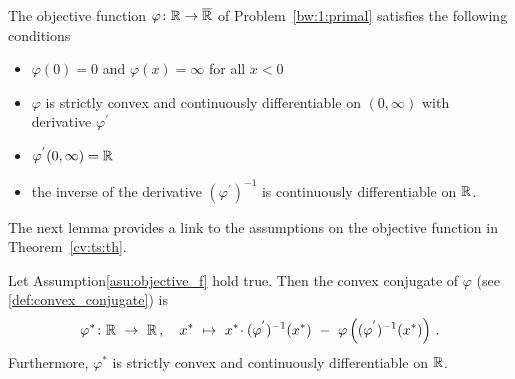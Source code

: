 \begin{assumption}
  \label{asu:objective_f}
  The objective function $\varphi\colon \mathbb{R}\to\overline{\mathbb{R}}$ of Problem~\ref{bw:1:primal} 
  satisfies the following conditions
  \begin{itemize}
    \item
      $\varphi(0)=0$ and $\varphi(x)=\infty$ for all $x<0$
    \item
      $\varphi$ is strictly convex and continuously differentiable on $(0,\infty)$ with derivative $\varphi^{'}$
    \item
      $\varphi^{'}(0,\infty)=\mathbb{R}$
    \item
      the inverse of the derivative $(\varphi^{'})^{-1}$ is continuously differentiable on $\mathbb{R}$.
  \end{itemize}
\end{assumption}
The next lemma provides a link to the assumptions on the objective function in Theorem~\ref{cv:ts:th}.
\newpage
\begin{lemma}
  \label{1065}
  Let Assumption\ref{asu:objective_f} hold true. Then the convex conjugate of $\varphi$ (see \eqref{def:convex_conjugate}) is
  \begin{gather*}
    \varphi^*
    \colon
    \R
    \ 
    \to
    \ 
    \R
    \,,
    \quad
    x^*
    \ 
    \mapsto
    \ 
    x^*
    \!
    \cdot
    (
    \varphi^{'}
    )^{-1}
    (x^*)
    \ 
    -
    \ 
    \varphi
    \left( 
      (
    \varphi^{'}
    )^{-1}
    (x^*)
    \right)
    \,.
  \end{gather*}
  Furthermore, $\varphi^*$ is strictly convex and continuously differentiable on $\mathbb{R}$.
\end{lemma}
